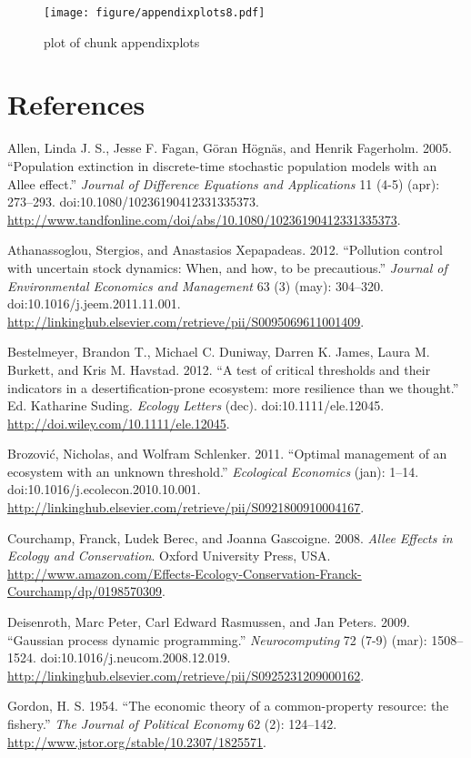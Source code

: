 \documentclass[author-year, review]{elsarticle} %
\makeatletter
\def\maxwidth{\ifdim\Gin@nat@width>\linewidth\linewidth
\else\Gin@nat@width\fi}
\let\Oldincludegraphics\includegraphics
\renewcommand{\includegraphics}[1]{\Oldincludegraphics[width=\maxwidth]{#1}}
\makeatother
\begin{document}
\begin{figure}[htbp]
\centering
\texttt{[image: figure/appendixplots8.pdf]}
\caption{plot of chunk appendixplots}
\end{figure}

\section{References}

Allen, Linda J. S., Jesse F. Fagan, Göran Högnäs, and Henrik Fagerholm.
2005. ``Population extinction in discrete-time stochastic population
models with an Allee effect.'' \emph{Journal of Difference Equations and
Applications} 11 (4-5) (apr): 273--293.
doi:10.1080/10236190412331335373.
\url{http://www.tandfonline.com/doi/abs/10.1080/10236190412331335373}.

Athanassoglou, Stergios, and Anastasios Xepapadeas. 2012. ``Pollution
control with uncertain stock dynamics: When, and how, to be
precautious.'' \emph{Journal of Environmental Economics and Management}
63 (3) (may): 304--320. doi:10.1016/j.jeem.2011.11.001.
\url{http://linkinghub.elsevier.com/retrieve/pii/S0095069611001409}.

Bestelmeyer, Brandon T., Michael C. Duniway, Darren K. James, Laura M.
Burkett, and Kris M. Havstad. 2012. ``A test of critical thresholds and
their indicators in a desertification-prone ecosystem: more resilience
than we thought.'' Ed. Katharine Suding. \emph{Ecology Letters} (dec).
doi:10.1111/ele.12045. \url{http://doi.wiley.com/10.1111/ele.12045}.

Brozović, Nicholas, and Wolfram Schlenker. 2011. ``Optimal management of
an ecosystem with an unknown threshold.'' \emph{Ecological Economics}
(jan): 1--14. doi:10.1016/j.ecolecon.2010.10.001.
\url{http://linkinghub.elsevier.com/retrieve/pii/S0921800910004167}.

Courchamp, Franck, Ludek Berec, and Joanna Gascoigne. 2008. \emph{Allee
Effects in Ecology and Conservation}. Oxford University Press, USA.
\url{http://www.amazon.com/Effects-Ecology-Conservation-Franck-Courchamp/dp/0198570309}.

Deisenroth, Marc Peter, Carl Edward Rasmussen, and Jan Peters. 2009.
``Gaussian process dynamic programming.'' \emph{Neurocomputing} 72 (7-9)
(mar): 1508--1524. doi:10.1016/j.neucom.2008.12.019.
\url{http://linkinghub.elsevier.com/retrieve/pii/S0925231209000162}.

Gordon, H. S. 1954. ``The economic theory of a common-property resource:
the fishery.'' \emph{The Journal of Political Economy} 62 (2): 124--142.
\url{http://www.jstor.org/stable/10.2307/1825571}.
\end{document}
